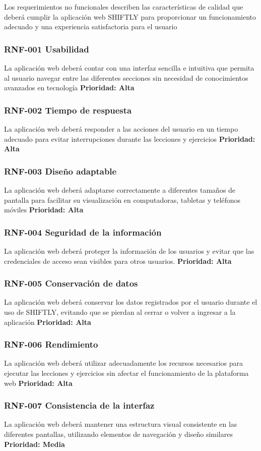 Los requerimientos no funcionales describen las características de calidad
que deberá cumplir la aplicación web SHIFTLY para proporcionar un
funcionamiento adecuado y una experiencia satisfactoria para el usuario
\subsubsection{RNF-001 Usabilidad}
La aplicación web deberá contar con una interfaz sencilla e intuitiva que
permita al usuario navegar entre las diferentes secciones sin necesidad
de conocimientos avanzados en tecnología
\textbf{Prioridad: Alta}
\subsubsection{RNF-002 Tiempo de respuesta}
La aplicación web deberá responder a las acciones del usuario en un tiempo
adecuado para evitar interrupciones durante las lecciones y ejercicios
\textbf{Prioridad: Alta}
\subsubsection{RNF-003 Diseño adaptable}
La aplicación web deberá adaptarse correctamente a diferentes tamaños de
pantalla para facilitar su visualización en computadoras, tabletas y
teléfonos móviles
\textbf{Prioridad: Alta}
\subsubsection{RNF-004 Seguridad de la información}
La aplicación web deberá proteger la información de los usuarios y evitar
que las credenciales de acceso sean visibles para otros usuarios.
\textbf{Prioridad: Alta}
\subsubsection{RNF-005 Conservación de datos}
La aplicación web deberá conservar los datos registrados por el usuario
durante el uso de SHIFTLY, evitando que se pierdan al cerrar o volver a
ingresar a la aplicación
\textbf{Prioridad: Alta}
\subsubsection{RNF-006 Rendimiento}
La aplicación web deberá utilizar adecuadamente los recursos necesarios
para ejecutar las lecciones y ejercicios sin afectar el funcionamiento de
la plataforma web
\textbf{Prioridad: Alta}
\subsubsection{RNF-007 Consistencia de la interfaz}
La aplicación web deberá mantener una estructura visual consistente en las
diferentes pantallas, utilizando elementos de navegación y diseño
similares
\textbf{Prioridad: Media}
